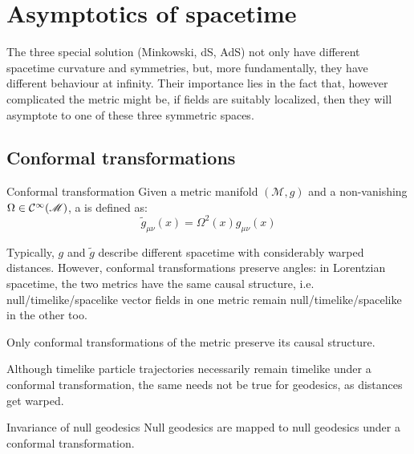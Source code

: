 \newpage
\section{Asymptotics of spacetime}

The three special solution (Minkowski, dS, AdS) not only have different spacetime curvature and symmetries, but, more fundamentally, they have different behaviour at infinity. Their importance lies in the fact that, however complicated the metric might be, if fields are suitably localized, then they will asymptote to one of these three symmetric spaces.

\subsection{Conformal transformations}

\begin{definition}{Conformal transformation}{}
  Given a metric manifold $ (\mathcal{M},g) $ and a non-vanishing $ \Omega \in \mathcal{C}^{\infty}(\mathscr{M}) $, a  is defined as:
  \begin{equation}
    \tilde{g}_{\mu \nu}(x) = \Omega^2(x) g_{\mu \nu}(x)
  \end{equation}
\end{definition}

Typically, $ g $ and $ \tilde{g} $ describe different spacetime with considerably warped distances. However, conformal transformations preserve angles: in Lorentzian spacetime, the two metrics have the same causal structure, i.e. null/timelike/spacelike vector fields in one metric remain null/timelike/spacelike in the other too.

\begin{proposition}{}{}
  Only conformal transformations of the metric preserve its causal structure.
\end{proposition}

Although timelike particle trajectories necessarily remain timelike under a conformal transformation, the same needs not be true for geodesics, as distances get warped.

\begin{proposition}{Invariance of null geodesics}{}
  Null geodesics are mapped to null geodesics under a conformal transformation.
\end{proposition}

